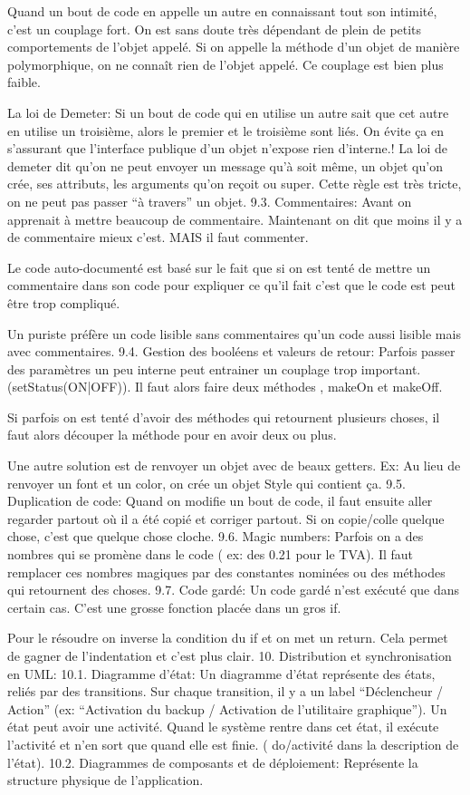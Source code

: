 Quand un bout de code en appelle un autre en connaissant tout son intimité, c’est un couplage fort. On est sans doute très dépendant de plein de petits comportements de l’objet appelé.
Si on appelle la méthode d’un objet de manière polymorphique, on ne connaît rien de l’objet appelé. Ce couplage est bien plus faible.

La loi de Demeter: Si un bout de code qui en utilise un autre sait que cet autre en utilise un troisième, alors le premier et le troisième sont liés. On évite ça en s’assurant que l’interface publique d’un objet n’expose rien d’interne.!
La loi de demeter dit qu’on ne peut envoyer un message qu’à soit même, un objet qu’on crée, ses attributs, les arguments qu’on reçoit ou super. Cette règle est très tricte, on ne peut pas passer “à travers” un objet.
9.3. Commentaires:
Avant on apprenait à mettre beaucoup de commentaire. Maintenant on dit que moins il y a de commentaire mieux c’est. MAIS il faut commenter.

Le code auto-documenté est basé sur le fait que si on est tenté de mettre un commentaire dans son code pour expliquer ce qu’il fait c’est que le code est peut être trop compliqué.

Un puriste préfère un code lisible sans commentaires qu’un code aussi lisible mais avec commentaires.
9.4. Gestion des booléens et valeurs de retour:
Parfois passer des paramètres un peu interne peut entrainer un couplage trop important. (setStatus(ON|OFF)). Il faut alors faire deux méthodes , makeOn et makeOff.

Si parfois on est tenté d’avoir des méthodes qui retournent plusieurs choses, il faut alors découper la méthode pour en avoir deux ou plus.

Une autre solution est de renvoyer un objet avec de beaux getters. Ex: Au lieu de renvoyer un font et un color, on crée un objet Style qui contient ça.
9.5. Duplication de code:
Quand on modifie un bout de code, il faut ensuite aller regarder partout où il a été copié et corriger partout. Si on copie/colle quelque chose, c’est que quelque chose cloche.
9.6. Magic numbers:
Parfois on a des nombres qui se promène dans le code ( ex: des 0.21 pour le TVA).
Il faut remplacer ces nombres magiques par des constantes nominées ou des méthodes qui retournent des choses.
9.7. Code gardé:
Un code gardé n’est exécuté que dans certain cas. C’est une grosse fonction placée dans un gros if.

Pour le résoudre on inverse la condition du if et on met un return.
Cela permet de gagner de l’indentation et c’est plus clair.
10. Distribution et synchronisation en UML:
10.1. Diagramme d’état:
Un diagramme d’état représente des états, reliés par des transitions.
Sur chaque transition, il y a un label “Déclencheur / Action”
(ex: “Activation du backup / Activation de l’utilitaire graphique”).
Un état peut avoir une activité. Quand le système rentre dans cet état, il exécute l’activité et n’en sort que quand elle est finie. ( do/activité dans la description de l’état).
10.2. Diagrammes de composants et de déploiement:
Représente la structure physique de l’application.

